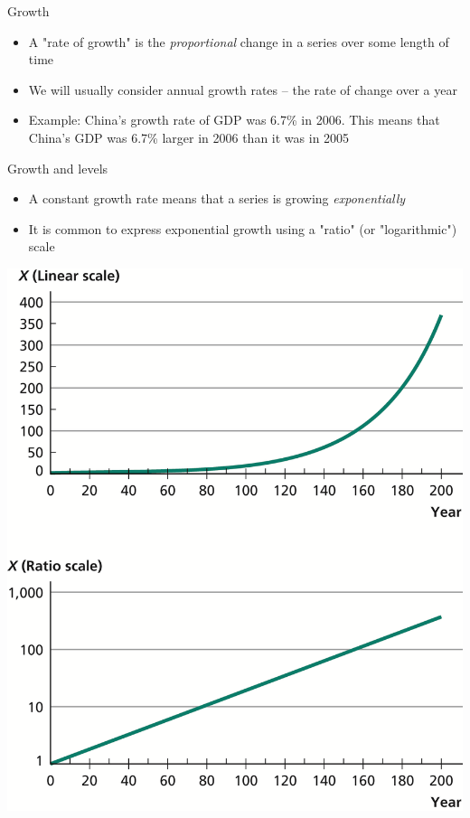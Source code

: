 \documentclass[10pt]{beamer}
\begin{document}
\begin{frame}[label={sec:orgf268b9a}]{}
\alert{Growth}
\begin{itemize}
\item A "rate of growth" is the \emph{proportional} change in a series over some length of time
\item We will usually consider annual growth rates -- the rate of change over a year
\item Example: China's growth rate of GDP was 6.7\% in 2006. This means that China's GDP was 6.7\% larger in 2006 than it was in 2005
\end{itemize}
\end{frame}

\begin{frame}[label={sec:org8696d45}]{}
\alert{Growth and levels}
\begin{itemize}
\item A constant growth rate means that a series is growing \emph{exponentially}
\item It is common to express exponential growth using a "ratio" (or "logarithmic") scale
\end{itemize}
\end{frame}

\begin{frame}[label={sec:org1656461}]{}
\begin{center}
\includegraphics[height=.9\textheight]{./img/1.3.png}
\end{center}
\end{frame}
\end{document}
